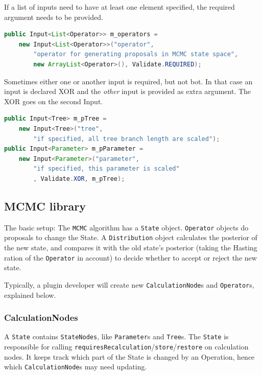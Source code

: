 \documentclass{article}
\begin{document}
If a list of inputs need to have at least one element specified, the required
argument needs to be provided.

{\color{blue}\begin{lstlisting}[language=java]
public Input<List<Operator>> m_operators = 
    new Input<List<Operator>>("operator",
        "operator for generating proposals in MCMC state space",
        new ArrayList<Operator>(), Validate.REQUIRED);
\end{lstlisting}}

Sometimes either one or another input is required, but not bot. In that case
an input is declared XOR and the {\em other} input is provided as extra argument.
The XOR goes on the second Input.

{\color{blue}\begin{lstlisting}[language=java]
public Input<Tree> m_pTree = 
    new Input<Tree>("tree", 
        "if specified, all tree branch length are scaled");
public Input<Parameter> m_pParameter = 
    new Input<Parameter>("parameter", 
        "if specified, this parameter is scaled"
        , Validate.XOR, m_pTree);
\end{lstlisting}}


\subsection{MCMC library\label{ssec.mcmc}}

The basic setup: The {\tt MCMC} algorithm has a {\tt State} object. {\tt Operator} objects do 
proposals to change the State. A {\tt Distribution} object calculates the posterior of the
new state, and compares it with the old state's posterior (taking the Hasting ration of the
{\tt Operator} in account) to decide whether to accept or reject the new state.

Typically, a plugin developer will create new {\tt CalculationNode}s and {\tt Operator}s,
explained below.

\subsubsection{CalculationNodes\label{ssec.calc}}

A {\tt State} contains {\tt StateNodes}, like {\tt Parameter}s and {\tt Tree}s. The {\tt State}
is responsible for calling {\tt requiresRecalculation}/{\tt store}/{\tt restore} on calculation nodes. It keeps
track which part of the State is changed by an Operation, hence which {\tt CalculationNode}s
may need updating.
\end{document}

